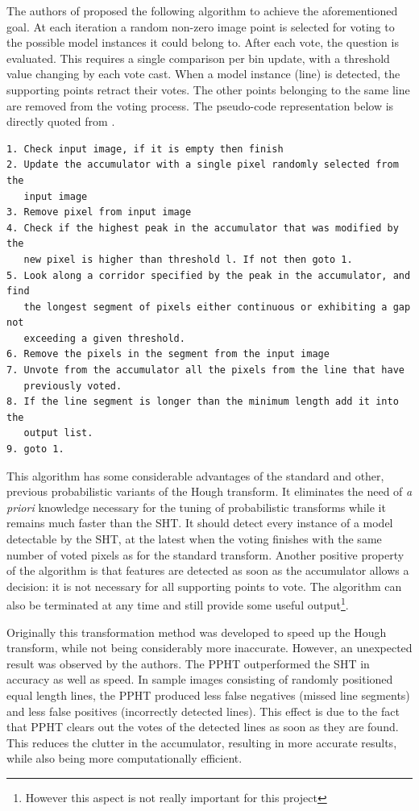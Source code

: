 The authors of \cite{MATAS2000119} proposed the following algorithm to achieve the aforementioned goal.
At each iteration a random non-zero image point is selected for voting to the possible model instances it could belong to.
After each vote, the question \cite{MATAS2000119} is evaluated.
This requires a single comparison per bin update, with a threshold value changing by each vote cast.
When a model instance (line) is detected, the supporting points retract their votes.
The other points belonging to the same line are removed from the voting process.
The pseudo-code representation below is directly quoted from \cite{MATAS2000119}.

\begin{lstlisting}
1. Check input image, if it is empty then finish
2. Update the accumulator with a single pixel randomly selected from the 
   input image
3. Remove pixel from input image
4. Check if the highest peak in the accumulator that was modified by the 
   new pixel is higher than threshold l. If not then goto 1.
5. Look along a corridor specified by the peak in the accumulator, and find 
   the longest segment of pixels either continuous or exhibiting a gap not 
   exceeding a given threshold.
6. Remove the pixels in the segment from the input image
7. Unvote from the accumulator all the pixels from the line that have 
   previously voted.
8. If the line segment is longer than the minimum length add it into the 
   output list.
9. goto 1.
\end{lstlisting}

This algorithm has some considerable advantages of the standard and other, previous probabilistic variants of the Hough transform.
It eliminates the need of \textit{a priori} knowledge necessary for the tuning of probabilistic transforms while it remains much faster than the SHT.
It should detect every instance of a model detectable by the SHT, at the latest when the voting finishes with the same number of voted pixels as for the standard transform.
Another positive property of the algorithm is that features are detected as soon as the accumulator allows a decision: it is not necessary for all supporting points to vote.
The algorithm can also be terminated at any time and still provide some useful output\footnote{However this aspect is not really important for this project}.

Originally this transformation method was developed to speed up the Hough transform, while not being considerably more inaccurate.
However, an unexpected result was observed by the authors.
The PPHT outperformed the SHT in accuracy as well as speed.
In sample images consisting of randomly positioned equal length lines, the PPHT produced less false negatives (missed line segments) and less false positives (incorrectly detected lines).
This effect is due to the fact that PPHT clears out the votes of the detected lines as soon as they are found.
This reduces the clutter in the accumulator, resulting in more accurate results, while also being more computationally efficient.

